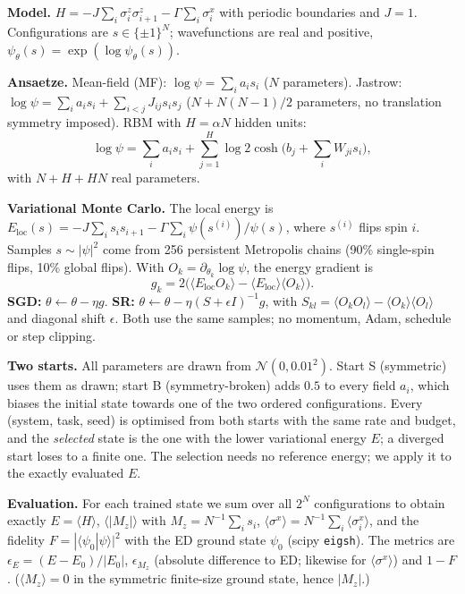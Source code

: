 \textbf{Model.} $H=-J\sum_i \sigma^z_i\sigma^z_{i+1}-\Gamma\sum_i\sigma^x_i$ with periodic boundaries and $J=1$. Configurations are $s\in\{\pm1\}^N$; wavefunctions are real and positive, $\psi_\theta(s)=\exp(\log\psi_\theta(s))$.

\textbf{Ansaetze.} Mean-field (MF): $\log\psi=\sum_i a_is_i$ ($N$ parameters). Jastrow: $\log\psi=\sum_i a_is_i+\sum_{i<j}J_{ij}s_is_j$ ($N+N(N-1)/2$ parameters, no translation symmetry imposed). RBM with $H=\alpha N$ hidden units:
\begin{equation}
\log\psi=\sum_i a_is_i+\sum_{j=1}^{H}\log 2\cosh\Big(b_j+\sum_iW_{ji}s_i\Big),
\end{equation}
with $N+H+HN$ real parameters.

\textbf{Variational Monte Carlo.} The local energy is $E_\mathrm{loc}(s)=-J\sum_is_is_{i+1}-\Gamma\sum_i\psi(s^{(i)})/\psi(s)$, where $s^{(i)}$ flips spin $i$. Samples $s\sim|\psi|^2$ come from 256 persistent Metropolis chains (90\% single-spin flips, 10\% global flips). With $O_k=\partial_{\theta_k}\log\psi$, the energy gradient is
\begin{equation}
g_k=2\big(\langle E_\mathrm{loc}O_k\rangle-\langle E_\mathrm{loc}\rangle\langle O_k\rangle\big).\label{eq:grad}
\end{equation}
\textbf{SGD:} $\theta\leftarrow\theta-\eta g$. \textbf{SR:} $\theta\leftarrow\theta-\eta(S+\epsilon I)^{-1}g$, with $S_{kl}=\langle O_kO_l\rangle-\langle O_k\rangle\langle O_l\rangle$ and diagonal shift $\epsilon$. Both use the same samples; no momentum, Adam, schedule or step clipping.

\textbf{Two starts.} All parameters are drawn from $\mathcal N(0,0.01^2)$. Start S (symmetric) uses them as drawn; start B (symmetry-broken) adds $0.5$ to every field $a_i$, which biases the initial state towards one of the two ordered configurations. Every (system, task, seed) is optimised from both starts with the same rate and budget, and the \emph{selected} state is the one with the lower variational energy $E$; a diverged start loses to a finite one. The selection needs no reference energy; we apply it to the exactly evaluated $E$.

\textbf{Evaluation.} For each trained state we sum over all $2^N$ configurations to obtain exactly $E=\langle H\rangle$, $\langle|M_z|\rangle$ with $M_z=N^{-1}\sum_is_i$, $\langle\sigma^x\rangle=N^{-1}\sum_i\langle\sigma^x_i\rangle$, and the fidelity $F=|\langle\psi_0|\psi\rangle|^2$ with the ED ground state $\psi_0$ (scipy \texttt{eigsh}). The metrics are $\epsilon_E=(E-E_0)/|E_0|$, $\epsilon_{M_z}$ (absolute difference to ED; likewise for $\langle\sigma^x\rangle$) and $1-F$. ($\langle M_z\rangle=0$ in the symmetric finite-size ground state, hence $|M_z|$.)

